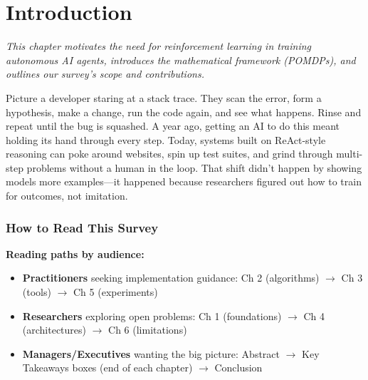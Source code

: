 \documentclass[12pt,a4paper]{report}
\theoremstyle{definition}
\begin{document}
\chapter{Introduction}
\label{ch:introduction}

\textit{This chapter motivates the need for reinforcement learning in training autonomous AI agents, introduces the mathematical framework (POMDPs), and outlines our survey's scope and contributions.}

\vspace{0.3cm}

Picture a developer staring at a stack trace. They scan the error, form a hypothesis, make a change, run the code again, and see what happens. Rinse and repeat until the bug is squashed. A year ago, getting an AI to do this meant holding its hand through every step. Today, systems built on ReAct-style reasoning \cite{yao2023react} can poke around websites, spin up test suites, and grind through multi-step problems without a human in the loop. That shift didn't happen by showing models more examples---it happened because researchers figured out how to train for outcomes, not imitation.

\subsection*{How to Read This Survey}

\textbf{Reading paths by audience:}
\begin{itemize}
    \item \textbf{Practitioners} seeking implementation guidance: Ch 2 (algorithms) $\rightarrow$ Ch 3 (tools) $\rightarrow$ Ch 5 (experiments)
    \item \textbf{Researchers} exploring open problems: Ch 1 (foundations) $\rightarrow$ Ch 4 (architectures) $\rightarrow$ Ch 6 (limitations)
    \item \textbf{Managers/Executives} wanting the big picture: Abstract $\rightarrow$ Key Takeaways boxes (end of each chapter) $\rightarrow$ Conclusion
\end{itemize}
\end{document}
